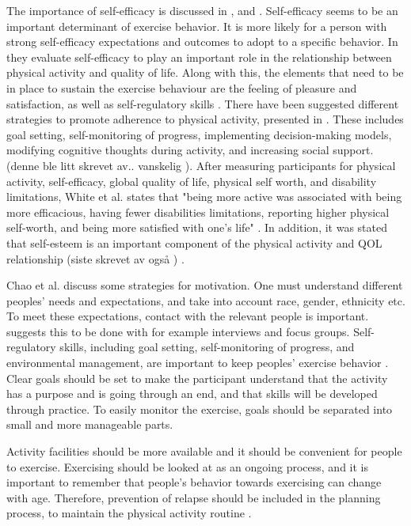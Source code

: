 The importance of self-efficacy is discussed in \cite{schutzer}, \cite{chao} and \cite{white}. Self-efficacy seems to be an important determinant of exercise behavior. It is more likely for a person with strong self-efficacy expectations and outcomes to adopt to a specific behavior. In \cite{white} they evaluate self-efficacy to play an important role in the relationship between physical activity and quality of life. Along with this, the elements that need to be in place to sustain  the exercise behaviour are the feeling of pleasure and satisfaction, as well as self-regulatory skills \cite{schutzer}. There have been suggested different strategies to promote adherence to physical activity, presented in \cite{chao}. These includes goal setting, self-monitoring of progress, implementing decision-making models, modifying cognitive thoughts during activity, and increasing social support. (denne ble litt skrevet av.. vanskelig \cite{chao}). After measuring participants for physical activity, self-efficacy, global quality of life, physical self worth, and disability limitations, White et al. states that "being more active was associated with being more efficacious, having fewer disabilities limitations, reporting higher physical self-worth, and being more satisfied with one's life" \cite{white}. In addition, it was stated that self-esteem is an important component of the physical activity and QOL relationship (siste skrevet av også ) \cite{white}. 

Chao et al. \cite{chao} discuss some strategies for motivation.  One must understand different peoples' needs and expectations, and take into account race, gender, ethnicity etc.  To meet these expectations, contact with the relevant people is important. \cite{chao} suggests this to be done with for example interviews and focus groups.  Self-regulatory skills, including goal setting, self-monitoring of progress, and environmental management, are important to keep peoples' exercise behavior \cite{chao}. Clear goals should be set to make the participant understand that the activity has a purpose and is going through an end, and that skills will be developed through practice. To easily monitor the exercise, goals should be separated into small and more manageable parts. 

Activity facilities should be more available and it should be convenient for people to exercise. Exercising should be looked at as an ongoing process, and it is important to remember that people's behavior towards exercising can change with age. Therefore, prevention of relapse should be included in the planning process, to maintain the physical activity routine \cite{chao}. 

